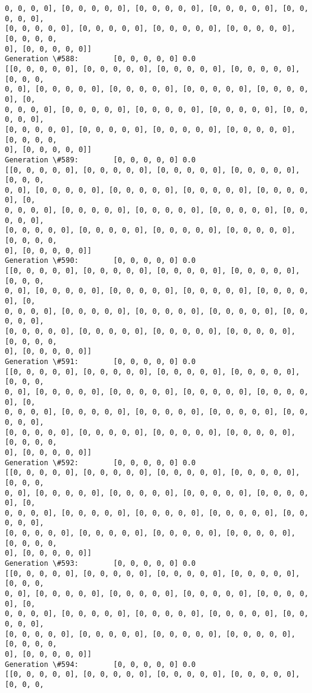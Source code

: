 \documentclass[11pt]{article}
\begin{document}
\begin{Verbatim}[commandchars=\\\{\}]
0, 0, 0, 0], [0, 0, 0, 0, 0], [0, 0, 0, 0, 0], [0, 0, 0, 0, 0], [0, 0, 0, 0, 0],
[0, 0, 0, 0, 0], [0, 0, 0, 0, 0], [0, 0, 0, 0, 0], [0, 0, 0, 0, 0], [0, 0, 0, 0,
0], [0, 0, 0, 0, 0]]
Generation \#588:        [0, 0, 0, 0, 0] 0.0
[[0, 0, 0, 0, 0], [0, 0, 0, 0, 0], [0, 0, 0, 0, 0], [0, 0, 0, 0, 0], [0, 0, 0,
0, 0], [0, 0, 0, 0, 0], [0, 0, 0, 0, 0], [0, 0, 0, 0, 0], [0, 0, 0, 0, 0], [0,
0, 0, 0, 0], [0, 0, 0, 0, 0], [0, 0, 0, 0, 0], [0, 0, 0, 0, 0], [0, 0, 0, 0, 0],
[0, 0, 0, 0, 0], [0, 0, 0, 0, 0], [0, 0, 0, 0, 0], [0, 0, 0, 0, 0], [0, 0, 0, 0,
0], [0, 0, 0, 0, 0]]
Generation \#589:        [0, 0, 0, 0, 0] 0.0
[[0, 0, 0, 0, 0], [0, 0, 0, 0, 0], [0, 0, 0, 0, 0], [0, 0, 0, 0, 0], [0, 0, 0,
0, 0], [0, 0, 0, 0, 0], [0, 0, 0, 0, 0], [0, 0, 0, 0, 0], [0, 0, 0, 0, 0], [0,
0, 0, 0, 0], [0, 0, 0, 0, 0], [0, 0, 0, 0, 0], [0, 0, 0, 0, 0], [0, 0, 0, 0, 0],
[0, 0, 0, 0, 0], [0, 0, 0, 0, 0], [0, 0, 0, 0, 0], [0, 0, 0, 0, 0], [0, 0, 0, 0,
0], [0, 0, 0, 0, 0]]
Generation \#590:        [0, 0, 0, 0, 0] 0.0
[[0, 0, 0, 0, 0], [0, 0, 0, 0, 0], [0, 0, 0, 0, 0], [0, 0, 0, 0, 0], [0, 0, 0,
0, 0], [0, 0, 0, 0, 0], [0, 0, 0, 0, 0], [0, 0, 0, 0, 0], [0, 0, 0, 0, 0], [0,
0, 0, 0, 0], [0, 0, 0, 0, 0], [0, 0, 0, 0, 0], [0, 0, 0, 0, 0], [0, 0, 0, 0, 0],
[0, 0, 0, 0, 0], [0, 0, 0, 0, 0], [0, 0, 0, 0, 0], [0, 0, 0, 0, 0], [0, 0, 0, 0,
0], [0, 0, 0, 0, 0]]
Generation \#591:        [0, 0, 0, 0, 0] 0.0
[[0, 0, 0, 0, 0], [0, 0, 0, 0, 0], [0, 0, 0, 0, 0], [0, 0, 0, 0, 0], [0, 0, 0,
0, 0], [0, 0, 0, 0, 0], [0, 0, 0, 0, 0], [0, 0, 0, 0, 0], [0, 0, 0, 0, 0], [0,
0, 0, 0, 0], [0, 0, 0, 0, 0], [0, 0, 0, 0, 0], [0, 0, 0, 0, 0], [0, 0, 0, 0, 0],
[0, 0, 0, 0, 0], [0, 0, 0, 0, 0], [0, 0, 0, 0, 0], [0, 0, 0, 0, 0], [0, 0, 0, 0,
0], [0, 0, 0, 0, 0]]
Generation \#592:        [0, 0, 0, 0, 0] 0.0
[[0, 0, 0, 0, 0], [0, 0, 0, 0, 0], [0, 0, 0, 0, 0], [0, 0, 0, 0, 0], [0, 0, 0,
0, 0], [0, 0, 0, 0, 0], [0, 0, 0, 0, 0], [0, 0, 0, 0, 0], [0, 0, 0, 0, 0], [0,
0, 0, 0, 0], [0, 0, 0, 0, 0], [0, 0, 0, 0, 0], [0, 0, 0, 0, 0], [0, 0, 0, 0, 0],
[0, 0, 0, 0, 0], [0, 0, 0, 0, 0], [0, 0, 0, 0, 0], [0, 0, 0, 0, 0], [0, 0, 0, 0,
0], [0, 0, 0, 0, 0]]
Generation \#593:        [0, 0, 0, 0, 0] 0.0
[[0, 0, 0, 0, 0], [0, 0, 0, 0, 0], [0, 0, 0, 0, 0], [0, 0, 0, 0, 0], [0, 0, 0,
0, 0], [0, 0, 0, 0, 0], [0, 0, 0, 0, 0], [0, 0, 0, 0, 0], [0, 0, 0, 0, 0], [0,
0, 0, 0, 0], [0, 0, 0, 0, 0], [0, 0, 0, 0, 0], [0, 0, 0, 0, 0], [0, 0, 0, 0, 0],
[0, 0, 0, 0, 0], [0, 0, 0, 0, 0], [0, 0, 0, 0, 0], [0, 0, 0, 0, 0], [0, 0, 0, 0,
0], [0, 0, 0, 0, 0]]
Generation \#594:        [0, 0, 0, 0, 0] 0.0
[[0, 0, 0, 0, 0], [0, 0, 0, 0, 0], [0, 0, 0, 0, 0], [0, 0, 0, 0, 0], [0, 0, 0,

\end{Verbatim}
\end{document}
